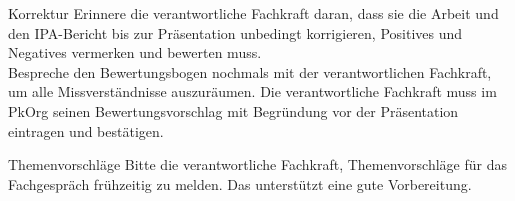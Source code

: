 \begin{taskitem}{Korrektur}
  Erinnere die verantwortliche Fachkraft daran, dass sie die Arbeit und den IPA-Bericht bis zur Präsentation unbedingt korrigieren, Positives und Negatives vermerken und bewerten muss.\\ Bespreche den Bewertungsbogen nochmals mit der verantwortlichen Fachkraft, um alle Missverständnisse auszuräumen. Die verantwortliche Fachkraft muss im PkOrg seinen Bewertungsvorschlag mit Begründung vor der Präsentation eintragen und bestätigen.
\end{taskitem}
\begin{taskitem}{Themenvorschläge}
  Bitte die verantwortliche Fachkraft, Themenvorschläge für das Fachgespräch frühzeitig zu melden. Das unterstützt eine gute Vorbereitung.
\end{taskitem}
